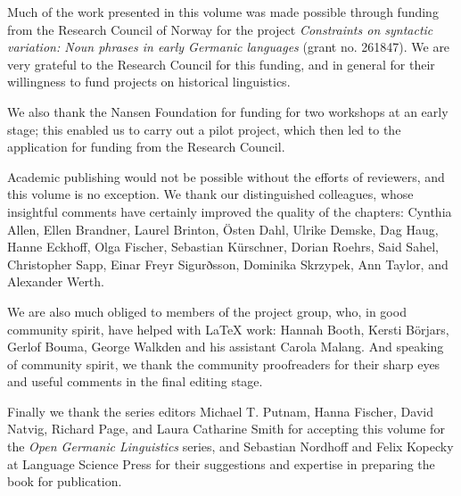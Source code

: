 

Much of the work presented in this volume was made possible through funding from the Research Council of Norway for the project \textit{Constraints on syntactic variation: Noun phrases in early Germanic languages} (grant no. 261847). We are very grateful to the Research Council for this funding, and in general for their willingness to fund projects on historical linguistics.

We also thank the Nansen Foundation for funding for two workshops at an early stage; this enabled us to carry out a pilot project, which then led to the application for funding from the Research Council.

Academic publishing would not be possible without the efforts of reviewers, and this volume is no exception. We thank our distinguished colleagues, whose insightful comments have certainly improved the quality of the chapters: Cynthia Allen, Ellen Brandner, Laurel Brinton, Östen Dahl, Ulrike Demske, Dag Haug, Hanne Eckhoff, Olga Fischer, Sebastian Kürschner,  Dorian Roehrs, Said Sahel, Christopher Sapp, Einar Freyr Sigurðsson, Dominika Skrzypek, Ann Taylor, and Alexander Werth.

We are also much obliged to members of the project group, who, in good community spirit, have helped with \LaTeX{} work: Hannah Booth, Kersti Börjars, Gerlof Bouma, George Walkden and his assistant Carola Malang. And speaking of community spirit, we thank the community proofreaders for their sharp eyes and useful comments in the final editing stage.  

Finally we thank the series editors Michael T. Putnam, Hanna Fischer, David Natvig, Richard Page, and Laura Catharine Smith for accepting this volume for the \textit{Open Germanic Linguistics} series, and Sebastian Nordhoff and Felix Kopecky at Language Science Press for their suggestions and expertise in preparing the book for publication. 
